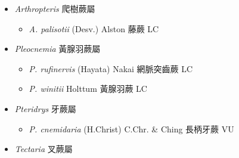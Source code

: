 
  \begin{itemize}
 \item[] \textit{Arthropteris} 爬樹蕨屬
                                
  \begin{itemize}
        \item[] \textit{A. palisotii} (Desv.) Alston  藤蕨   LC
  \end{itemize}
 \item[] \textit{Pleocnemia} 黃腺羽蕨屬
                                
  \begin{itemize}
        \item[] \textit{P. rufinervis} (Hayata) Nakai  網脈突齒蕨   LC
        \item[] \textit{P. winitii} Holttum  黃腺羽蕨   LC
  \end{itemize}
 \item[] \textit{Pteridrys} 牙蕨屬
                                
  \begin{itemize}
        \item[] \textit{P. cnemidaria} (H.Christ) C.Chr. \& Ching  長柄牙蕨   VU
  \end{itemize}
 \item[] \textit{Tectaria} 叉蕨屬
                                

\end{itemize}
